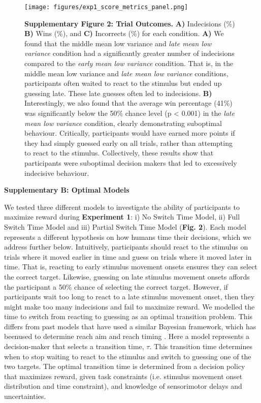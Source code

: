 \documentclass[12pt]{article}
\newcommand\boldblue[1]{\textcolor{mydarkblue}{\textbf{#1}}}
\begin{document}
\begin{figure}[H]
    \centering
    \texttt{[image: figures/exp1\_score\_metrics\_panel.png]}

    \caption*{\boldblue{Supplementary Figure 2: Trial Outcomes.} \boldblue{A)} Indecisions (\%) \boldblue{B)} Wins (\%), and \boldblue{C)} Incorrects (\%) for each condition. \boldblue{A)} We found that the middle mean low variance and \emph{late mean low variance} condition had a significantly greater number of indecisions compared to the \emph{early mean low variance} condition. That is, in the middle mean low variance and \emph{late mean low variance} conditions, participants often waited to react to the stimulus but ended up guessing late. These late guesses often led to indecisions. \boldblue{B)} Interestingly, we also found that the average win percentage (41\%) was significantly below the 50\% chance level (p < 0.001) in the \emph{late mean low variance} condition, clearly demonstrating suboptimal behaviour. Critically, participants would have earned more points if they had simply guessed early on all trials, rather than attempting to react to the stimulus. Collectively, these results show that participants were suboptimal decision makers that led to excessively indecisive behaviour.}
\end{figure}

\newpage
\noindent\boldblue{\large{Supplementary B: Optimal Models}}
\vspace{-1mm}

We tested three different models to investigate the ability of participants to maximize reward during \boldblue{Experiment 1}: i) No Switch Time Model, ii) Full Switch Time Model and iii) Partial Switch Time Model (\boldblue{Fig. 2}). Each model represents a different hypothesis on how humans time their decisions, which we address further below. Intuitively, participants should react to the stimulus on trials where it moved earlier in time and guess on trials where it moved later in time. That is, reacting to early stimulus movement onsets ensures they can select the correct target. Likewise, guessing on late stimulus movement onsets affords the participant a 50\% chance of selecting the correct target. However, if participants wait too long to react to a late stimulus movement onset, then they might make too many indecisions and fail to maximize reward.
We modelled the time to switch from reacting to guessing as an optimal transition problem. This differs from past models that have used a similar Bayesian framework, which has beenused to determine reach aim \autocite{trommershauserStatisticalDecisionTheory2003} and reach timing \autocite{hudsonOptimalCompensationTemporal2008}. Here a model represents a decision-maker that selects a transition time, $\tau$. This transition time determines when to stop waiting to react to the stimulus and switch to guessing one of the two targets. The optimal transition time is determined from a decision policy that maximizes reward, given task constraints (i.e. stimulus movement onset distribution and time constraint), and knowledge of sensorimotor delays and uncertainties.
\end{document}
